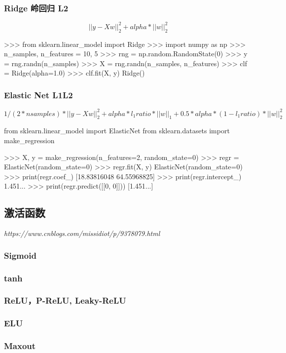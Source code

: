 \documentclass{scrartcl}
\numberwithin{equation}{section}
\begin{document}
\subsubsection{Ridge 岭回归 L2}
$$||y - Xw||^2_2 + alpha * ||w||^2_2$$
\begin{python}
>>> from sklearn.linear_model import Ridge
>>> import numpy as np
>>> n_samples, n_features = 10, 5
>>> rng = np.random.RandomState(0)
>>> y = rng.randn(n_samples)
>>> X = rng.randn(n_samples, n_features)
>>> clf = Ridge(alpha=1.0)
>>> clf.fit(X, y)
Ridge()
\end{python}
\subsubsection{Elastic Net L1L2}
$$ 1 / (2 * nsamples) * ||y - Xw||^2_2
+ alpha * l_1ratio * ||w||_1
+ 0.5 * alpha * (1 - l_1ratio) * ||w||^2_2$$
\begin{python}
    from sklearn.linear_model import ElasticNet
    from sklearn.datasets import make_regression

    >>> X, y = make_regression(n_features=2, random_state=0)
    >>> regr = ElasticNet(random_state=0)
    >>> regr.fit(X, y)
    ElasticNet(random_state=0)
    >>> print(regr.coef_)
    [18.83816048 64.55968825]
    >>> print(regr.intercept_)
    1.451...
    >>> print(regr.predict([[0, 0]]))
    [1.451...]
\end{python}




\subsection{激活函数}
\textsl{https://www.cnblogs.com/missidiot/p/9378079.html}
\subsubsection{Sigmoid}
\subsubsection{tanh}
\subsubsection{ReLU，P-ReLU, Leaky-ReLU}
\subsubsection{ELU}
\subsubsection{Maxout}
\end{document}
